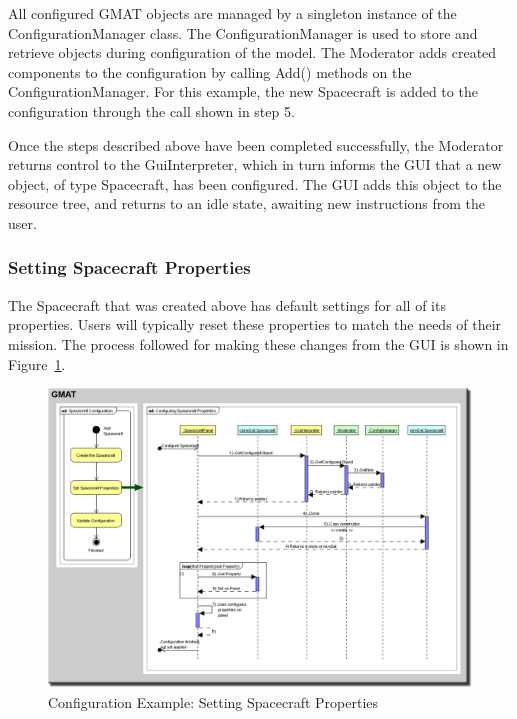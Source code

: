 All configured GMAT objects are managed by a singleton instance of the ConfigurationManager class.
The ConfigurationManager is used to store and retrieve objects during configuration of the model.
The Moderator adds created components to the configuration by calling Add() methods on the
ConfigurationManager.  For this example, the new Spacecraft is added to the configuration through
the call shown in step 5.

Once the steps described above have been completed successfully, the Moderator returns control to
the GuiInterpreter, which in turn informs the GUI that a new object, of type Spacecraft, has been
configured.  The GUI adds this object to the resource tree, and returns to an idle state, awaiting
new instructions from the user.

\subsubsection{\label{section:ObjectConfiguration}Setting Spacecraft Properties}

The Spacecraft that was created above has default settings for all of its properties.  Users will
typically reset these properties to match the needs of their mission.  The process followed for
making these changes from the GUI is shown in Figure~\ref{figure:ConfiguringResource}.

\begin{figure}[htb]
\begin{center}
\includegraphics[460,326]{Images/SpacecraftConfiguration.png}
\caption{\label{figure:ConfiguringResource}Configuration Example: Setting Spacecraft Properties}
\end{center}
\end{figure}

